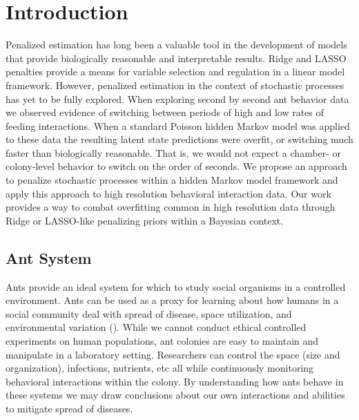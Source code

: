 \documentclass[smallextended]{svjour3}       %
\begin{document}
\section{Introduction}
\label{s:intro}


Penalized estimation has long been a valuable tool in the development of models that provide biologically reasonable and interpretable results.  Ridge and LASSO penalties provide a means for variable selection and regulation in a linear model framework.  However, penalized estimation in the context of stochastic processes has yet to be fully explored. When exploring second by second ant behavior data we observed evidence of switching between periods of high and low rates of feeding interactions. When a standard Poisson hidden Markov model was applied to these data the resulting latent state predictions were overfit, or switching much faster than biologically reasonable. That is, we would not expect a chamber- or colony-level behavior to switch on the order of seconds. We propose an approach to penalize stochastic processes within a hidden Markov model framework and apply this approach to high resolution behavioral interaction data. Our work provides a way to combat overfitting common in high resolution data through  Ridge or LASSO-like penalizing priors within a Bayesian context.

\subsection{Ant System}
Ants provide an ideal system for which to study social organisms in a controlled environment. Ants can be used as a proxy for learning about how humans in a social community deal with spread of disease, space utilization, and environmental variation (\cite{Fewell2013}). While we cannot conduct ethical controlled experiments on human populations, ant colonies are easy to maintain and manipulate in a laboratory setting. Researchers can control the space (size and organization), infections, nutrients, etc all while continuously monitoring behavioral interactions within the colony. By understanding how ants behave in these systems we may draw conclusions about our own interactions and abilities to mitigate spread of diseases. 
\end{document}
